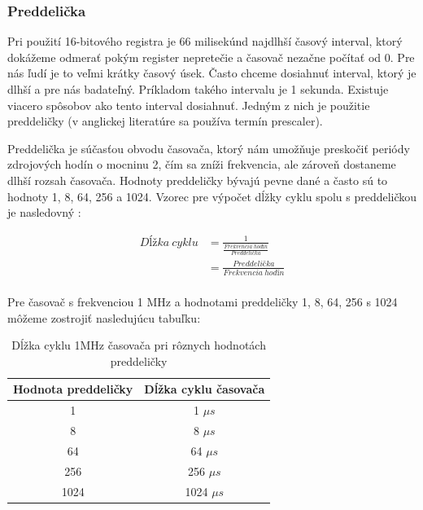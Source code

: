 \subsubsection{Preddelička}
\noindent \par
Pri použití 16-bitového registra je 66 milisekúnd najdlhší časový interval, ktorý dokážeme odmerať pokým register nepretečie a časovač nezačne počítať od 0.
Pre nás ľudí je to veľmi krátky časový úsek. Často chceme dosiahnuť interval, ktorý je dlhší a pre nás badateľný. Príkladom takého intervalu je 1 sekunda.
Existuje viacero spôsobov ako tento interval dosiahnuť. Jedným z nich je použitie preddeličky (v anglickej literatúre sa používa termín prescaler).
\par
Preddelička je súčasťou obvodu časovača, ktorý nám umožňuje preskočiť periódy zdrojových hodín o mocninu 2, čím sa zníži frekvencia,
ale zároveň dostaneme dlhší rozsah časovača.
Hodnoty preddeličky bývajú pevne dané a často sú to hodnoty 1, 8, 64, 256 a 1024. Vzorec pre výpočet dĺžky cyklu spolu s preddeličkou je nasledovný \cite{atmelATmega64012801281}:

\begin{equation} \label{eq:cycle-length}
    \begin{aligned}
        Dĺžka\:cyklu & = \frac{1}{\frac{Frekvencia\:hodín}{Preddelička}} \\
                     & = \frac{Preddelička}{Frekvencia\:hodín}           \\
    \end{aligned}
\end{equation}

Pre časovač s frekvenciou 1 \acrshort{MHz} a hodnotami preddeličky 1, 8, 64, 256 s 1024 môžeme zostrojiť nasledujúcu tabuľku:
\begin{table}[!htbp]
    \begin{center}
        \begin{tabular}{|c|c|}
            \hline
            Hodnota preddeličky & Dĺžka cyklu časovača \\
            \hline
            1                   & 1 $\mu s$            \\
            8                   & 8 $\mu s$            \\
            64                  & 64 $\mu s$           \\
            256                 & 256 $\mu s$          \\
            1024                & 1024 $\mu s$         \\
            \hline
        \end{tabular}
        \caption{Dĺžka cyklu 1MHz časovača pri rôznych hodnotách preddeličky}
        \label{table:timerPrescaler}
    \end{center}
\end{table}

